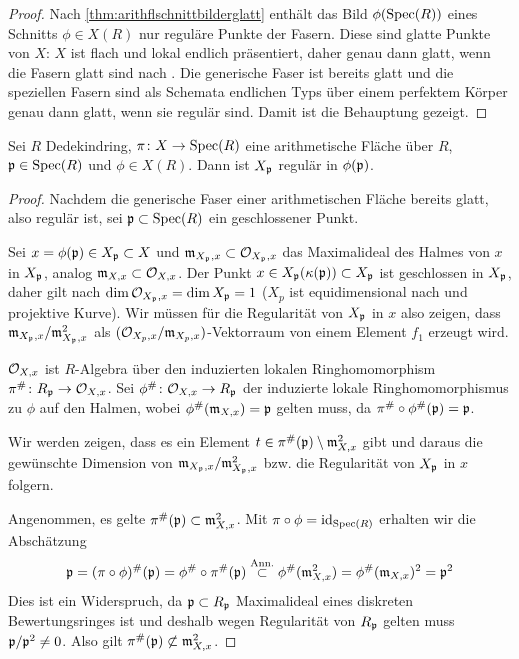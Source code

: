 \documentclass[german]{scrreprt}
\begin{document}
\begin{Satz}
\begin{proof}
    Nach \ref{thm:arithflschnittbilderglatt} enthält das Bild
    $\phi(\operatorname{Spec}(R))$ eines Schnitts $\phi\in X(R)$ nur reguläre
    Punkte der Fasern. Diese sind glatte Punkte von $X$:
    $X$ ist flach und lokal endlich präsentiert, daher genau dann
    glatt, wenn die Fasern glatt sind nach
    \cite[8.5, Proposition 17]{bosch}.
    Die generische Faser ist bereits glatt und die speziellen Fasern
    sind als Schemata endlichen Typs über einem perfektem Körper
    genau dann glatt, wenn sie regulär sind.
    Damit ist die Behauptung gezeigt.
  \end{proof}
\end{Satz}

\begin{Lemma}\label{thm:arithflschnittbilderglatt}
  \cite[Proposition IV.4.3]{silverman2}
  Sei $R$ Dedekindring,
  $\pi\colon X\to\operatorname{Spec}(R)$ eine arithmetische Fläche über $R$,
  $\mathfrak{p}\in\operatorname{Spec}(R)$ und $\phi\in X(R)$.
  Dann ist $X_{\mathfrak{p}}$ regulär in $\phi(\mathfrak{p})$.
  \begin{proof}
    Nachdem die generische Faser einer arithmetischen Fläche bereits
    glatt, also regulär ist, sei $\mathfrak{p}\subset\operatorname{Spec}(R)$ ein geschlossener
    Punkt.
    
    Sei $x=\phi(\mathfrak{p})\in X_{\mathfrak{p}}\subset X$ und $\mathfrak{m}_{X_{\mathfrak{p}},x}\subset\mathcal{O}_{X_{\mathfrak{p}},x}$
    das Maximalideal des Halmes von $x$ in $X_{\mathfrak{p}}$,
    analog $\mathfrak{m}_{X,x}\subset\mathcal{O}_{X,x}$.
    Der Punkt $x\in X_{\mathfrak{p}}(\kappa(\mathfrak{p}))\subset X_{\mathfrak{p}}$ ist geschlossen in $X_{\mathfrak{p}}$,
    daher gilt nach \cite[Corollary 2.5.24]{liu}
    $\dim\mathcal{O}_{X_{\mathfrak{p}},x}=\dim X_{\mathfrak{p}}=1$ ($X_p$ ist equidimensional nach
    \cite[Proposition 4.4.16]{liu} und projektive Kurve).
    Wir müssen für die Regularität von $X_{\mathfrak{p}}$ in $x$ also zeigen, dass
    $\mathfrak{m}_{X_{\mathfrak{p}},x}/\mathfrak{m}_{X_{\mathfrak{p}},x}^2$ als $(\mathcal{O}_{X_p,x}/\mathfrak{m}_{X_p,x})$-Vektorraum
    von einem Element $f_1$ erzeugt wird.
    
    $\mathcal{O}_{X,x}$ ist $R$-Algebra über den induzierten lokalen
    Ringhomomorphism $\pi^\#\colon R_{\mathfrak{p}}\to\mathcal{O}_{X,x}$.
    Sei $\phi^\#\colon\mathcal{O}_{X,x}\to R_{\mathfrak{p}}$ der induzierte lokale
    Ringhomomorphismus zu $\phi$ auf den Halmen, wobei
    $\phi^\#(\mathfrak{m}_{X,x})=\mathfrak{p}$ gelten muss, da $\pi^\#\circ\phi^\#(\mathfrak{p})=\mathfrak{p}$.
    
    Wir werden zeigen, dass es ein Element
    $t\in\pi^\#(\mathfrak{p})\setminus\mathfrak{m}_{X,x}^2$ gibt und
    daraus die gewünschte Dimension von $\mathfrak{m}_{X_{\mathfrak{p}},x}/\mathfrak{m}_{X_{\mathfrak{p}},x}^2$
    bzw. die Regularität von $X_{\mathfrak{p}}$ in $x$ folgern.

    Angenommen, es gelte $\pi^\#(\mathfrak{p})\subset\mathfrak{m}_{X,x}^2$.
    Mit $\pi\circ\phi=\mathrm{id}_{\operatorname{Spec}(R)}$ erhalten wir die Abschätzung
    \begin{gather*}
      \mathfrak{p} = (\pi\circ\phi)^\#(\mathfrak{p})
      = \phi^\#\circ\pi^\#(\mathfrak{p})
      \overset{\text{Ann.}}{\subset} \phi^\#(\mathfrak{m}_{X,x}^2)
      = \phi^\#(\mathfrak{m}_{X,x})^2
      = \mathfrak{p}^2
    \end{gather*}
    Dies ist ein Widerspruch, da $\mathfrak{p}\subset R_{\mathfrak{p}}$ Maximalideal eines
    diskreten Bewertungsringes ist und deshalb wegen Regularität von
    $R_{\mathfrak{p}}$ gelten muss $\mathfrak{p}/\mathfrak{p}^2\neq 0$.
    Also gilt $\pi^\#(\mathfrak{p})\not\subset\mathfrak{m}_{X,x}^2$.


\end{proof}
\end{Lemma}
\end{document}
